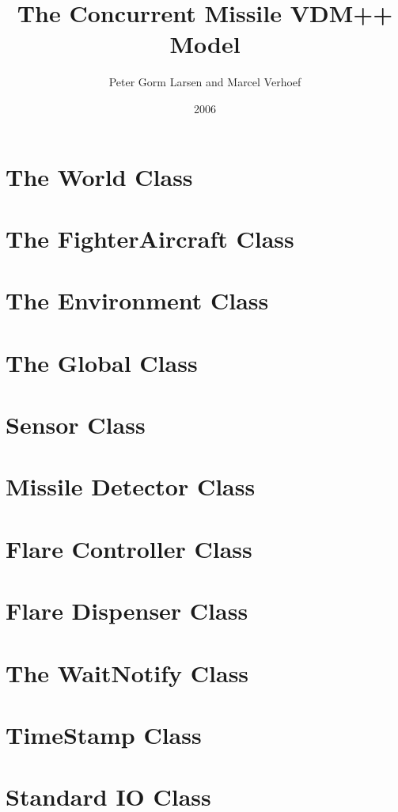 \documentclass[\pformat,12pt]{article}
\title{The Concurrent Missile VDM++ Model}
\author{Peter Gorm Larsen and Marcel Verhoef}
\date{2006}
\begin{document}
\maketitle

\section{The World Class}



\section{The FighterAircraft Class}



\section{The Environment Class}



\section{The Global Class}



\section{Sensor Class}



\section{Missile Detector Class}



\section{Flare Controller Class}



\section{Flare Dispenser Class}



\section{The WaitNotify Class}



\section{TimeStamp Class}



\section{Standard IO Class}


\end{document}
